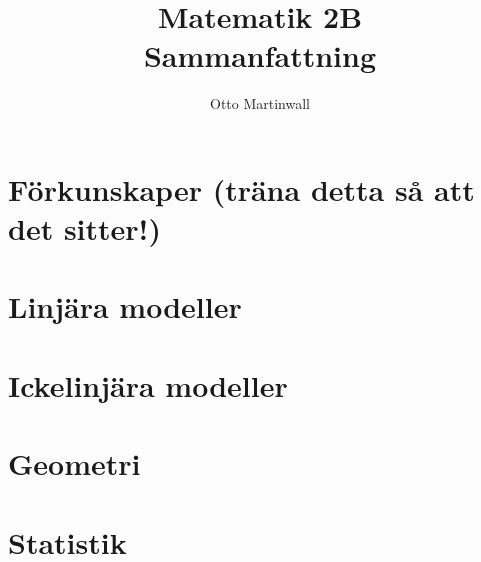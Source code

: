
\usepackage[swedish]{babel}

\title{Matematik 2B \\ Sammanfattning}
\author{Otto Martinwall}


\maketitle
\tableofcontents
\newpage



\section{Förkunskaper (träna detta så att det sitter!)}


\section{Linjära modeller}


\section{Ickelinjära modeller}


\section{Geometri}


\section{Statistik}



